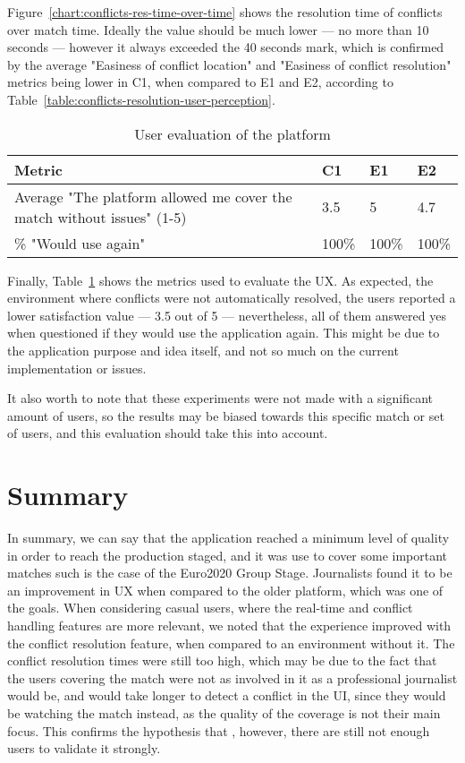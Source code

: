 Figure~\ref{chart:conflicts-res-time-over-time} shows the resolution time of conflicts over match time. Ideally the value should be much lower --- no more than 10 seconds --- however it always exceeded the 40 seconds mark, which is confirmed by the average "Easiness of conflict location" and "Easiness of conflict resolution" metrics being lower in C1, when compared to E1 and E2, according to Table~\ref{table:conflicts-resolution-user-perception}. 

\begin{table}
    \centering
    \caption{User evaluation of the platform}
    \begin{tabular}{|l|l|l|l|}
        \hline
        \textbf{Metric}                        & \textbf{C1} & \textbf{E1} & \textbf{E2} \\ \hline \hline
        Average "The platform allowed me cover the match without issues" (1-5)   & 3.5  & 5  & 4.7  \\ \hline
        \% "Would use again"   & 100\%  & 100\%  & 100\%  \\ \hline
    \end{tabular}
    \label{table:user-platform-evaluation}
\end{table}

Finally, Table~\ref{table:user-platform-evaluation} shows the metrics used to evaluate the UX. As expected, the environment where conflicts were not automatically resolved, the users reported a lower satisfaction value --- 3.5 out of 5 --- nevertheless, all of them answered yes when questioned if they would use the application again. This might be due to the application purpose and idea itself, and not so much on the current implementation or issues.

It also worth to note that these experiments were not made with a significant amount of users, so the results may be biased towards this specific match or set of users, and this evaluation should take this into account.

\section{Summary}

In summary, we can say that the application reached a minimum level of quality in order to reach the production staged, and it was use to cover some important matches such is the case of the Euro2020 Group Stage. Journalists found it to be an improvement in UX when compared to the older platform, which was one of the goals. When considering casual users, where the real-time and conflict handling features are more relevant, we noted that the experience improved with the conflict resolution feature, when compared to an environment without it. The conflict resolution times were still too high, which may be due to the fact that the users covering the match were not as involved in it as a professional journalist would be, and would take longer to detect a conflict in the UI, since they would be watching the match instead, as the quality of the coverage is not their main focus. This confirms the hypothesis that , however, there are still not enough users to validate it strongly.
